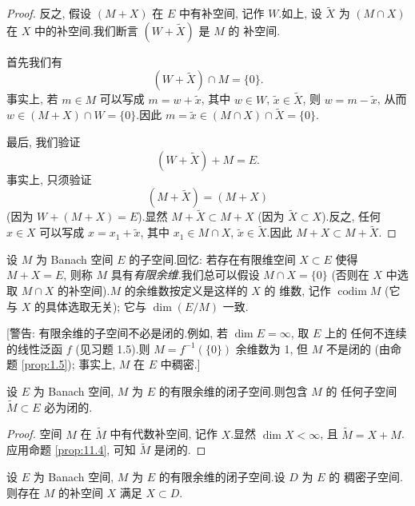 \begin{proof}
反之, 假设 $(M+X)$ 在 $E$ 中有补空间, 记作 $W$.如上, 设 $\widetilde X$
为 $(M\cap X)$ 在 $X$ 中的补空间.我们断言 $(W+\widetilde X)$ 是 $M$ 的
补空间.

首先我们有
\begin{equation*}
(W+\widetilde X)\cap M=\{0\}.
\end{equation*}
事实上, 若 $m\in M$ 可以写成 $m=w+\tilde x$, 其中 $w\in W$,
$\tilde x\in\widetilde X$, 则 $w=m-\tilde x$, 从而
$w\in(M+X)\cap W=\{0\}$.因此
$m=\tilde x\in(M\cap X)\cap\widetilde X=\{0\}$.

最后, 我们验证
\begin{equation*}
(W+\widetilde X)+M=E.
\end{equation*}
事实上, 只须验证
\begin{equation*}
(M+\widetilde X)=(M+X)
\end{equation*}
(因为 $W+(M+X)=E$).显然 $M+\widetilde X\subset M+X$ (因为
$\widetilde X\subset X$).反之, 任何 $x\in X$ 可以写成 $x=x_1+\tilde x$,
其中 $x_1\in M\cap X$, $\tilde x\in\widetilde X$.因此
$M+X\subset M+\widetilde X$.
\end{proof}

设 $M$ 为 Banach 空间 $E$ 的子空间.回忆: 若存在有限维空间 $X\subset E$
使得 $M+X=E$, 则称 $M$ 具有\emph{有限余维}.我们总可以假设 $M\cap X=\{0\}$
(否则在 $X$ 中选取 $M\cap X$ 的补空间).$M$ 的余维数按定义是这样的 $X$ 的
维数, 记作 $\operatorname{codim}M$ (它与 $X$ 的具体选取无关); 它与
$\dim(E/M)$ 一致.

[警告: 有限余维的子空间不必是闭的.例如, 若 $\dim E=\infty$, 取 $E$ 上的
任何不连续的线性泛函 $f$ (见习题 1.5).则 $M=f^{-1}(\{0\})$ 余维数为 1,
但 $M$ 不是闭的 (由命题  \ref{prop:1.5}); 事实上, $M$ 在 $E$ 中稠密.]

\begin{proposition}
\label{prop:11.5}
设 $E$ 为 Banach 空间, $M$ 为 $E$ 的有限余维的闭子空间.则包含 $M$ 的
任何子空间 $\widetilde M\subset E$ 必为闭的.
\end{proposition}

\begin{proof}
空间 $M$ 在 $\widetilde M$ 中有代数补空间, 记作 $X$.显然 $\dim X<\infty$,
且 $\widetilde M=X+M$.应用命题  \ref{prop:11.4}, 可知 $\widetilde M$ 是闭的.
\end{proof}

\begin{proposition}
\label{prop:11.6}
设 $E$ 为 Banach 空间, $M$ 为 $E$ 的有限余维的闭子空间.设 $D$ 为 $E$ 的
稠密子空间.则存在 $M$ 的补空间 $X$ 满足 $X\subset D$.
\end{proposition}

